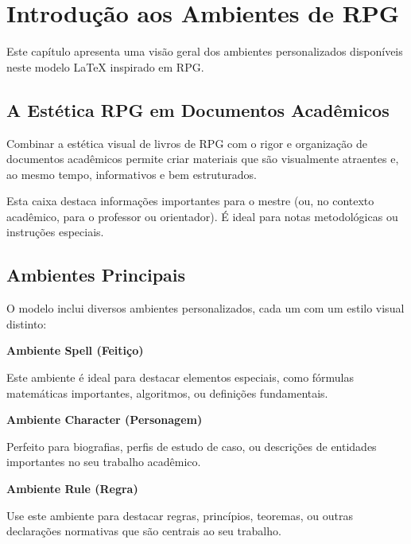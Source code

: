 \section{Introdução aos Ambientes de RPG}

Este capítulo apresenta uma visão geral dos ambientes personalizados disponíveis neste modelo LaTeX inspirado em RPG.

\subsection{A Estética RPG em Documentos Acadêmicos}

Combinar a estética visual de livros de RPG com o rigor e organização de documentos acadêmicos permite criar materiais que são visualmente atraentes e, ao mesmo tempo, informativos e bem estruturados.


\begin{dmnote}
Esta caixa destaca informações importantes para o mestre (ou, no contexto acadêmico, para o professor ou orientador). É ideal para notas metodológicas ou instruções especiais.
\end{dmnote}

\subsection{Ambientes Principais}

O modelo inclui diversos ambientes personalizados, cada um com um estilo visual distinto:

\begin{spell}
\textbf{Ambiente Spell (Feitiço)}

Este ambiente é ideal para destacar elementos especiais, como fórmulas matemáticas importantes, algoritmos, ou definições fundamentais.
\end{spell}

\begin{character}
\textbf{Ambiente Character (Personagem)}

Perfeito para biografias, perfis de estudo de caso, ou descrições de entidades importantes no seu trabalho acadêmico.
\end{character}

\begin{rule}
\textbf{Ambiente Rule (Regra)}

Use este ambiente para destacar regras, princípios, teoremas, ou outras declarações normativas que são centrais ao seu trabalho.
\end{rule}

